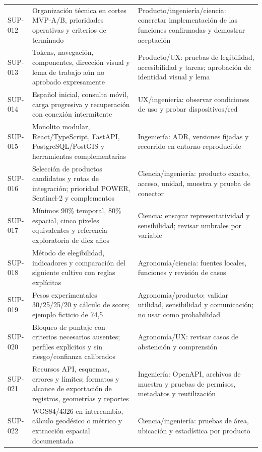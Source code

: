 \documentclass[10pt,a4paper]{article}
\begin{document}
\begin{longtable}{>{\raggedright\arraybackslash}p{2.061cm}>{\raggedright\arraybackslash}p{7.294cm}>{\raggedright\arraybackslash}p{6.501cm}}
SUP-012 & Organización técnica en cortes MVP-A/\allowbreak{}B, prioridades operativas y criterios de terminado & Producto/\allowbreak{}ingeniería/\allowbreak{}ciencia: concretar implementación de las funciones confirmadas y demostrar aceptación \\[3pt]
SUP-013 & Tokens, navegación, componentes, dirección visual y lema de trabajo aún no aprobado expresamente & Producto/\allowbreak{}UX: pruebas de legibilidad, accesibilidad y tareas; aprobación de identidad visual y lema \\[3pt]
SUP-014 & Español inicial, consulta móvil, carga progresiva y recuperación con conexión intermitente & UX/\allowbreak{}ingeniería: observar condiciones de uso y probar dispositivos/\allowbreak{}red \\[3pt]
SUP-015 & Monolito modular, React/\allowbreak{}TypeScript, FastAPI, PostgreSQL/\allowbreak{}PostGIS y herramientas complementarias & Ingeniería: ADR, versiones fijadas y recorrido en entorno reproducible \\[3pt]
SUP-016 & Selección de productos candidatos y rutas de integración; prioridad POWER, Sentinel-2 y complementos & Ciencia/\allowbreak{}ingeniería: producto exacto, acceso, unidad, muestra y prueba de conector \\[3pt]
SUP-017 & Mínimos 90\% temporal, 80\% espacial, cinco píxeles equivalentes y referencia exploratoria de diez años & Ciencia: ensayar representatividad y sensibilidad; revisar umbrales por variable \\[3pt]
SUP-018 & Método de elegibilidad, indicadores y comparación del siguiente cultivo con reglas explícitas & Agronomía/\allowbreak{}ciencia: fuentes locales, funciones y revisión de casos \\[3pt]
SUP-019 & Pesos experimentales 30/\allowbreak{}25/\allowbreak{}25/\allowbreak{}20 y cálculo de score; ejemplo ficticio de 74,5 & Agronomía/\allowbreak{}producto: validar utilidad, sensibilidad y comunicación; no usar como probabilidad \\[3pt]
SUP-020 & Bloqueo de puntaje con criterios necesarios ausentes; perfiles explícitos y sin riesgo/\allowbreak{}confianza calibrados & Agronomía/\allowbreak{}UX: revisar casos de abstención y comprensión \\[3pt]
SUP-021 & Recursos API, esquemas, errores y límites; formatos y alcance de exportación de registros, geometrías y reportes & Ingeniería: OpenAPI, archivos de muestra y pruebas de permisos, metadatos y reutilización \\[3pt]
SUP-022 & WGS84/\allowbreak{}4326 en intercambio, cálculo geodésico o métrico y extracción espacial documentada & Ciencia/\allowbreak{}ingeniería: pruebas de área, ubicación y estadística por producto \\[3pt]

\end{longtable}
\end{document}

